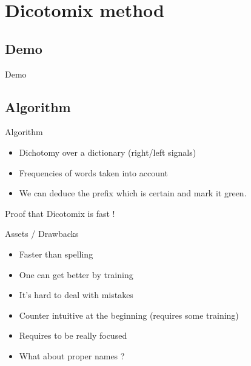 \documentclass[notes]{beamer}
\begin{document}
\section{Dicotomix method}

\subsection{Demo}
\begin{frame}{Demo}
	\begin{center}
	\end{center}
\end{frame}

\subsection{Algorithm}
\begin{frame}{Algorithm}
	\begin{center}
		\begin{itemize}
			\item Dichotomy over a dictionary (right/left signals)
			\item Frequencies of words taken into account
			\item We can deduce the prefix which is certain and mark it green.
		\end{itemize}
	\end{center}
\end{frame}

\begin{frame}{Proof that Dicotomix is fast !}
\end{frame}

\begin{frame}{Assets / Drawbacks}
	\begin{tcolorbox}[colback=green!5,colframe=green!40!black,title=Assets]
		\begin{itemize}
			\item Faster than spelling
			\item One can get better by training
		\end{itemize}
	\end{tcolorbox}
	\pause
	\begin{tcolorbox}[colback=red!5,colframe=red!40!black,title=Drawbacks]
		\begin{itemize}
			\item It's hard to deal with mistakes
			\item Counter intuitive at the beginning (requires some training)
			\item Requires to be really focused
			\item What about proper names ?
		\end{itemize}
	\end{tcolorbox}
\end{frame}
\end{document}
